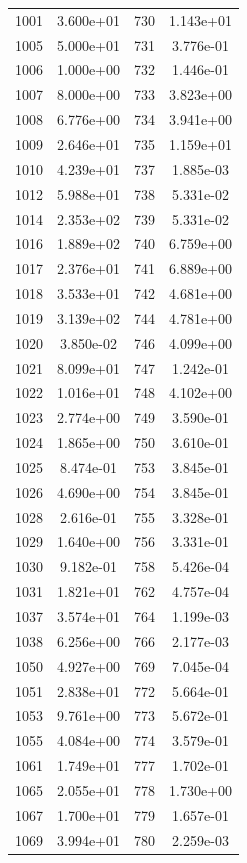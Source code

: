 \documentclass[12pt]{article}
\begin{document}
\begin{longtable}{@{}cccc@{}}
1001 & 3.600e+01 & 730 & 1.143e+01 \\
1005 & 5.000e+01 & 731 & 3.776e-01 \\
1006 & 1.000e+00 & 732 & 1.446e-01 \\
1007 & 8.000e+00 & 733 & 3.823e+00 \\
1008 & 6.776e+00 & 734 & 3.941e+00 \\
1009 & 2.646e+01 & 735 & 1.159e+01 \\
1010 & 4.239e+01 & 737 & 1.885e-03 \\
1012 & 5.988e+01 & 738 & 5.331e-02 \\
1014 & 2.353e+02 & 739 & 5.331e-02 \\
1016 & 1.889e+02 & 740 & 6.759e+00 \\
1017 & 2.376e+01 & 741 & 6.889e+00 \\
1018 & 3.533e+01 & 742 & 4.681e+00 \\
1019 & 3.139e+02 & 744 & 4.781e+00 \\
1020 & 3.850e-02 & 746 & 4.099e+00 \\
1021 & 8.099e+01 & 747 & 1.242e-01 \\
1022 & 1.016e+01 & 748 & 4.102e+00 \\
1023 & 2.774e+00 & 749 & 3.590e-01 \\
1024 & 1.865e+00 & 750 & 3.610e-01 \\
1025 & 8.474e-01 & 753 & 3.845e-01 \\
1026 & 4.690e+00 & 754 & 3.845e-01 \\
1028 & 2.616e-01 & 755 & 3.328e-01 \\
1029 & 1.640e+00 & 756 & 3.331e-01 \\
1030 & 9.182e-01 & 758 & 5.426e-04 \\
1031 & 1.821e+01 & 762 & 4.757e-04 \\
1037 & 3.574e+01 & 764 & 1.199e-03 \\
1038 & 6.256e+00 & 766 & 2.177e-03 \\
1050 & 4.927e+00 & 769 & 7.045e-04 \\
1051 & 2.838e+01 & 772 & 5.664e-01 \\
1053 & 9.761e+00 & 773 & 5.672e-01 \\
1055 & 4.084e+00 & 774 & 3.579e-01 \\
1061 & 1.749e+01 & 777 & 1.702e-01 \\
1065 & 2.055e+01 & 778 & 1.730e+00 \\
1067 & 1.700e+01 & 779 & 1.657e-01 \\
1069 & 3.994e+01 & 780 & 2.259e-03 \\

\end{longtable}
\end{document}
